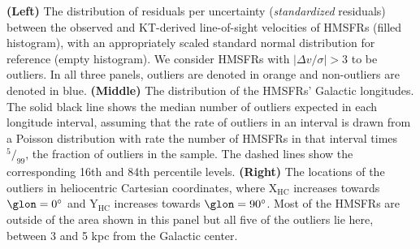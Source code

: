 \label{fig:outliers}
\textbf{(Left)} The distribution of residuals per uncertainty (\textit{standardized} residuals) between the observed and KT-derived line-of-sight velocities of HMSFRs (filled histogram), with an appropriately scaled standard normal distribution for reference (empty histogram). We consider HMSFRs with $\vert \Delta v / \sigma \vert > 3$ to be outliers. In all three panels, outliers are denoted in orange and non-outliers are denoted in blue. \textbf{(Middle)} The distribution of the HMSFRs' Galactic longitudes. 
The solid black line shows the median number of outliers expected in each longitude interval, assuming that the rate of outliers in an interval is drawn from a Poisson distribution with rate the number of HMSFRs in that interval times $^{5}/_{99}$, the fraction of outliers in the sample. The dashed lines show the corresponding 16th and 84th percentile levels.
\textbf{(Right)} The locations of the outliers in heliocentric Cartesian coordinates, where $\mathrm{X_{HC}}$ increases towards $\glon=0^\circ$ and $\mathrm{Y_{HC}}$ increases towards $\glon=90^\circ$. Most of the HMSFRs are outside of the area shown in this panel but all five of the outliers lie here, between 3 and 5 kpc from the Galactic center.